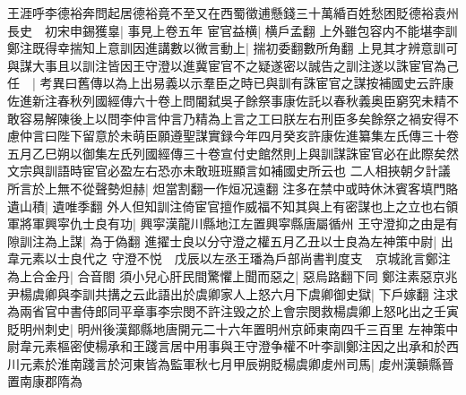王涯呼李德裕奔問起居德裕竟不至又在西蜀徵逋懸錢三十萬緍百姓愁困貶德裕袁州長史　初宋申錫獲辠|{
	事見上卷五年}
宦官益横|{
	横戶孟翻}
上外雖包容内不能堪李訓鄭注既得幸揣知上意訓因進講數以微言動上|{
	揣初委翻數所角翻}
上見其才辨意訓可與謀大事且以訓注皆因王守澄以進冀宦官不之疑遂密以誠告之訓注遂以誅宦官為己任　|{
	考異曰舊傳以為上出易義以示羣臣之時已與訓有誅宦官之謀按補國史云許康佐進新注春秋列國經傳六十卷上問閽弑吳子餘祭事康佐託以春秋義奥臣窮究未精不敢容易解陳後上以問李仲言仲言乃精為上言之工曰朕左右刑臣多矣餘祭之禍安得不慮仲言曰陛下留意於未萌臣願遵聖謀實録今年四月癸亥許康佐進纂集左氏傳三十卷五月乙巳朔以御集左氏列國經傳三十卷宣付史館然則上與訓謀誅宦官必在此際矣然文宗與訓語時宦官必盈左右恐亦未敢班班顯言如補國史所云也}
二人相挾朝夕計議所言於上無不從聲勢炟赫|{
	炟當割翻一作烜况遠翻}
注多在禁中或時休沐賓客填門賂遺山積|{
	遺唯季翻}
外人但知訓注倚宦官擅作威福不知其與上有密謀也上之立也右領軍將軍興寜仇士良有功|{
	興寜漢龍川縣地江左置興寜縣唐屬循州}
王守澄抑之由是有隙訓注為上謀|{
	為于偽翻}
進擢士良以分守澄之權五月乙丑以士良為左神策中尉|{
	出韋元素以士良代之}
守澄不悦　戊辰以左丞王璠為戶部尚書判度支　京城訛言鄭注為上合金丹|{
	合音閤}
須小兒心肝民間驚懼上聞而惡之|{
	惡烏路翻下同}
鄭注素惡京兆尹楊虞卿與李訓共搆之云此語出於虞卿家人上怒六月下虞卿御史獄|{
	下戶嫁翻}
注求為兩省官中書侍郎同平章事李宗閔不許注毁之於上會宗閔救楊虞卿上怒叱出之壬寅貶明州刺史|{
	明州後漢鄮縣地唐開元二十六年置明州京師東南四千三百里}
左神策中尉韋元素樞密使楊承和王踐言居中用事與王守澄争權不叶李訓鄭注因之出承和於西川元素於淮南踐言於河東皆為監軍秋七月甲辰朔貶楊虞卿䖍州司馬|{
	䖍州漢贑縣晉置南康郡隋為}


